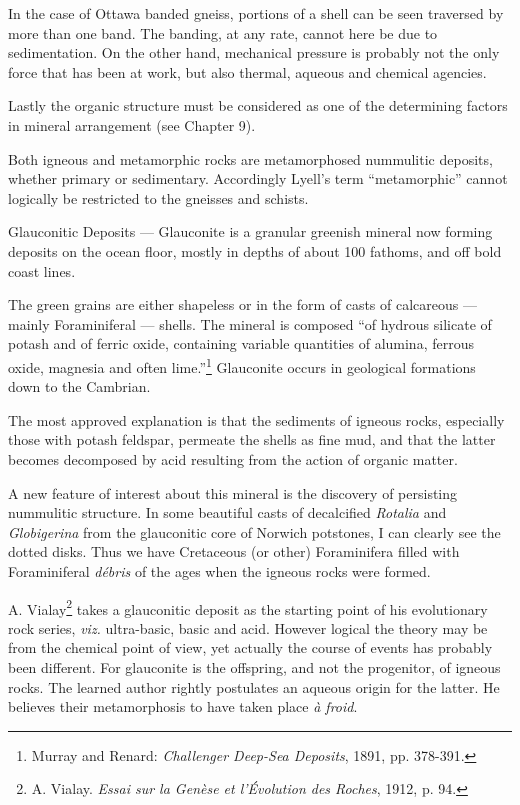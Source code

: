 \documentclass[a4paper, 12pt, oneside]{article}
\begin{document}
In the case of Ottawa banded gneiss, portions of a shell can be seen traversed by more than one band. The banding, at any rate, cannot here be due to sedimentation. On the other hand, mechanical pressure is probably not the only force that has been at work, but also thermal, aqueous and chemical agencies.

Lastly the organic structure must be considered as one of the determining factors in mineral arrangement (see Chapter 9).

Both igneous and metamorphic rocks are metamorphosed nummulitic deposits, whether primary or sedimentary. Accordingly Lyell's term ``metamorphic'' cannot logically be restricted to the gneisses and schists.

Glauconitic Deposits --- Glauconite is a granular greenish mineral now forming deposits on the ocean floor, mostly in depths of about 100 fathoms, and off bold coast lines.

The green grains are either shapeless or in the form of casts of calcareous --- mainly Foraminiferal --- shells. The mineral is composed ``of hydrous silicate of potash and of ferric oxide, containing variable quantities of alumina, ferrous oxide, magnesia and often lime.''\footnote{Murray and Renard: \emph{Challenger Deep-Sea Deposits}, 1891, pp. 378-391.} Glauconite occurs in geological formations down to the Cambrian.

The most approved explanation is that the sediments of igneous rocks, especially those with potash feldspar, permeate the shells as fine mud, and that the latter becomes decomposed by acid resulting from the action of organic matter.

A new feature of interest about this mineral is the discovery of persisting nummulitic structure. In some beautiful casts of decalcified \emph{Rotalia} and \emph{Globigerina} from the glauconitic core of Norwich potstones, I can clearly see the dotted disks. Thus we have Cretaceous (or other) Foraminifera filled with Foraminiferal \emph{débris} of the ages when the igneous rocks were formed.

A. Vialay\footnote{A. Vialay. \emph{Essai sur la Genèse et l'Évolution des Roches}, 1912, p. 94.} takes a glauconitic deposit as the starting point of his evolutionary rock series, \emph{viz.} ultra-basic, basic and acid. However logical the theory may be from the chemical point of view, yet actually the course of events has probably been different. For glauconite is the offspring, and not the progenitor, of igneous rocks. The learned author rightly postulates an aqueous origin for the latter. He believes their metamorphosis to have taken place \emph{à froid}.
\end{document}
